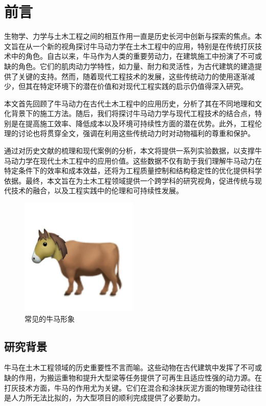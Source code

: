 \chapter{前言}
生物学、力学与土木工程之间的相互作用一直是历史长河中创新与探索的焦点。本文旨在从一个新的视角探讨牛马动力学在土木工程中的应用，特别是在传统打灰技术中的角色。自古以来，牛马作为人类的重要劳动力，在建筑施工中扮演了不可或缺的角色。它们的肌肉动力学特性，如力量、耐力和灵活性，为古代建筑的建造提供了关键的支持。然而，随着现代工程技术的发展，这些传统动力的使用逐渐减少，但其在特定环境下的潜在价值和对现代工程实践的启示仍值得深入研究。

本文首先回顾了牛马动力在古代土木工程中的应用历史，分析了其在不同地理和文化背景下的施工方法。随后，我们将探讨牛马动力学与现代工程技术的结合点，特别是在提高施工效率、降低成本以及环境可持续性方面的潜在优势。此外，工程伦理的讨论也将贯穿全文，强调在利用这些传统动力时对动物福利的尊重和保护。

通过对历史文献的梳理和现代案例的分析，本文将提供一系列实验数据，以支撑牛马动力学在现代土木工程中的应用价值。这些数据不仅有助于我们理解牛马动力在特定条件下的效率和成本效益，还将为工程质量控制和结构稳定性的优化提供科学依据。最终，本文旨在为土木工程领域提供一个跨学科的研究视角，促进传统与现代技术的融合，以及工程实践中的伦理和可持续性发展。
\begin{figure}[h]
    \centering
    \includegraphics[width=0.5\textwidth]{figures/R-C.jpg}
    \caption{常见的牛马形象}
    \end{figure}
    
\section{研究背景}
牛马在土木工程领域的历史重要性不言而喻。这些动物在古代建筑中发挥了不可或缺的作用，为搬运重物和提升大型梁等任务提供了可再生且适应性强的动力源\cite{smith2020biological}。在打灰技术方面，牛马的作用尤为关键。它们在混合和涂抹灰泥方面的物理劳动往往是人力所无法比拟的，为大型项目的顺利完成提供了必要助力\cite{chen2019mechanics}。

